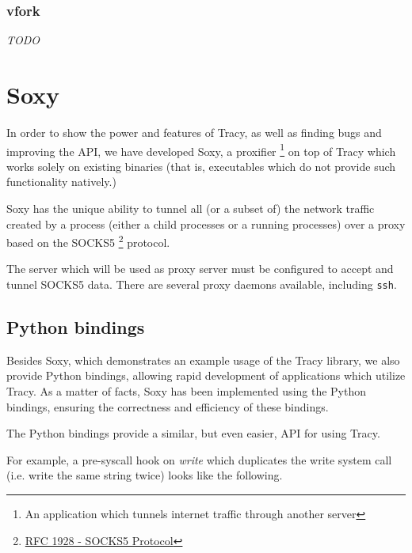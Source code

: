 \documentclass[a4paper, 10pt]{report}
\begin{document}
\subsection{vfork}
\textit{TODO}


\chapter{Soxy}

\label{chapter:soxy}

In order to show the power and features of Tracy, as well as finding bugs and
improving the API, we have developed Soxy, a proxifier \footnote{An
application which tunnels internet traffic through another server} on top of
Tracy which works solely on existing binaries (that is, executables which do
not provide such functionality natively.)

Soxy has the unique ability to tunnel all (or a subset of) the network traffic
created by a process (either a child processes or a running processes) over a
proxy based on the SOCKS5 \footnote{\href{http://www.ietf.org/rfc/rfc1928.txt}
{RFC 1928 - SOCKS5 Protocol}} protocol.

The server which will be used as proxy server must be configured to accept and
tunnel SOCKS5 data. There are several proxy daemons available, including
\verb=ssh=.

\section{Python bindings}


Besides Soxy, which demonstrates an example usage of the Tracy library, we
also provide Python bindings, allowing rapid development of applications
which utilize Tracy. As a matter of facts, Soxy has been implemented using the
Python bindings, ensuring the correctness and efficiency of these bindings.

The Python bindings provide a similar, but even easier, API for using Tracy.

For example, a pre-syscall hook on \textit{write} which duplicates the write
system call (i.e. write the same string twice) looks like the following.
\end{document}
